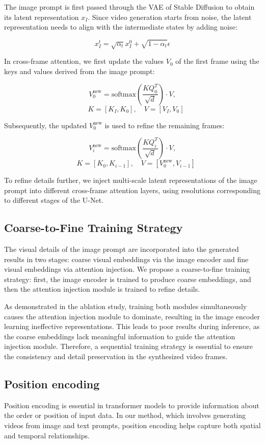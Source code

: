 The image prompt is first passed through the VAE of Stable Diffusion to obtain its latent representation \(x_I\). Since video generation starts from noise, the latent representation needs to align with the intermediate states by adding noise:

\[x_I^t = \sqrt{\alpha_t}x_I^0 + \sqrt{1-\alpha_t}\epsilon\]

In cross-frame attention, we first update the values \(V_0\) of the first frame using the keys and values derived from the image prompt:

\[V_0^{\text{new}} = \text{softmax}\left(\frac{KQ_0^T}{\sqrt{d}}\right) \cdot V,\]
\[\quad K = [K_I, K_0], \quad V = [V_I, V_0]\]

Subsequently, the updated \(V_0^{\text{new}}\) is used to refine the remaining frames:

\[V_i^{\text{new}} = \text{softmax}\left(\frac{KQ_i^T}{\sqrt{d}}\right) \cdot V,\]
\[\quad K = [K_0, K_{i-1}], \quad V = [V_0^{\text{new}}, V_{i-1}]\]

To refine details further, we inject multi-scale latent representations of the image prompt into different cross-frame attention layers, using resolutions corresponding to different stages of the U-Net.

\subsection{Coarse-to-Fine Training Strategy}
The visual details of the image prompt are incorporated into the generated results in two stages: coarse visual embeddings via the image encoder and fine visual embeddings via attention injection. We propose a coarse-to-fine training strategy: first, the image encoder is trained to produce coarse embeddings, and then the attention injection module is trained to refine details.

As demonstrated in the ablation study, training both modules simultaneously causes the attention injection module to dominate, resulting in the image encoder learning ineffective representations. This leads to poor results during inference, as the coarse embeddings lack meaningful information to guide the attention injection module. Therefore, a sequential training strategy is essential to ensure the consistency and detail preservation in the synthesized video frames.

\subsection{Position encoding}
Position encoding is essential in transformer models to provide information about the order or position of input data. In our method, which involves generating videos from image and text prompts, position encoding helps capture both spatial and temporal relationships.

